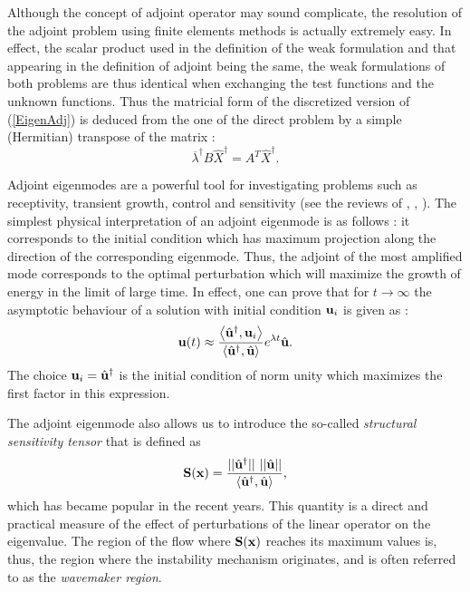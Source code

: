 \documentclass[twocolumn,10pt]{asme2ej}
\newcommand{\be}[1]{ \begin{equation} \label{#1}}
\newcommand{\ee}{\end{equation}}
\begin{document}
Although the concept of adjoint operator may sound complicate, the resolution of the adjoint problem using finite elements methods is actually extremely easy. In effect, the scalar product used in the definition of the weak formulation and that appearing in the definition of adjoint being the same, the weak formulations of both problems are thus identical when exchanging the test functions and the unknown functions. Thus the matricial form of the discretized version of (\ref{EigenAdj}) is deduced from the one of the direct problem by a simple (Hermitian) transpose of the matrix :
\be{Eigen_Adj_matricial}
\overline{\lambda}^\dag B \hat{X}^\dag = A^T \hat{X}^\dag.
\ee

Adjoint eigenmodes are a powerful tool for investigating problems such as receptivity, transient growth, control and sensitivity (see the reviews of \cite{Jmc2005}, \cite{Ps2007}, \cite{LucBott2014}). The simplest physical interpretation of an adjoint eigenmode is as follows : it corresponds to the initial condition which has maximum projection along the direction of the corresponding eigenmode.
Thus, the adjoint of the most amplified mode corresponds to the optimal perturbation which will maximize the growth of energy in the limit of large time. In effect, one can prove that for $t \rightarrow \infty$  the asymptotic behaviour of a solution with initial condition ${\bf u}_i$  is given as :
$$
{\bf u}(t) \approx 
\frac{ \left< \hat{\bf u}^\dag, {\bf u}_i\right>}{\left<\hat{\bf u}^\dag, \hat{\bf u}\right>} 
e^{\lambda t} \hat{\bf u}.
$$
The choice ${\bf u}_i = \hat{\bf u}^\dag$ is the initial condition of norm unity which maximizes the first factor in this expression.

The adjoint eigenmode also allows us to introduce the so-called {\em structural sensitivity tensor } that is defined as 
\be{Structursens} 
{\bf{S}}({\bf{x}}) = \frac{|| \hat{\bf u}^\dag|| \,\, ||\hat{\bf u}|| }{{\left<\hat{\bf u}^\dag, \hat{\bf u}\right>}},
\ee 
which has became popular in the recent years.
This quantity is a direct and practical measure of the effect of perturbations of the linear operator on the eigenvalue. The region of the flow where ${\bf{S}}({\bf{x}})$ reaches its maximum values is, thus, the region where the instability mechanism originates, and is often referred to as the {\em wavemaker region}.

\end{document}
